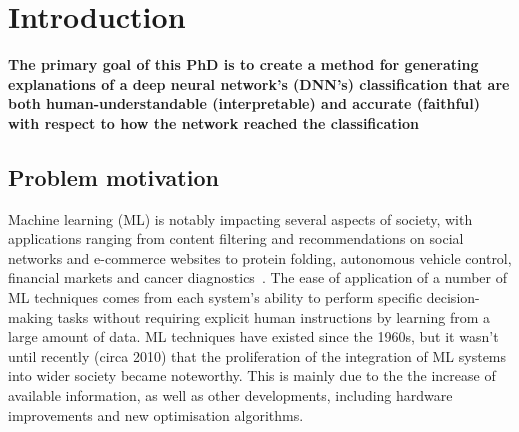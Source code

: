 \chapter{Introduction}
\justifying
\setlength{\parindent}{0em}
\textbf{The primary goal of this PhD is to create a method for generating explanations of a deep neural network’s (DNN's) classification that are both human-understandable (interpretable) and accurate (faithful) with respect to how  the  network reached  the classification}

\section{Problem motivation}

Machine learning (ML) is notably impacting several aspects of society, with applications ranging from content filtering and recommendations on social networks and e-commerce websites to protein folding, autonomous vehicle control, financial markets and cancer diagnostics~\cite{forthcoming}. The ease of application of a number of ML techniques comes from each system's ability to perform specific decision-making tasks without requiring explicit human instructions by learning from a large amount of data. ML techniques have existed since the 1960s, but it wasn't until recently (circa 2010) that the proliferation of the integration of ML systems into wider society became noteworthy. This is mainly due to the the increase of available information, as well as other developments, including hardware improvements and new optimisation algorithms.   


